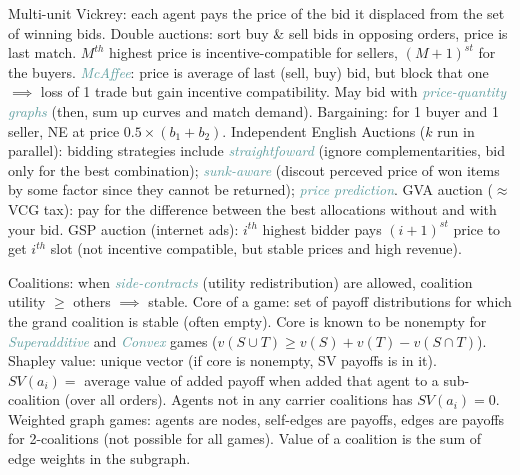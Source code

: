 \documentclass[10pt,a4paper,landscape]{article}
\newcommand{\concept}[1]{\textcolor{Emerald}{#1}} %
\newcommand{\subconcept}[1]{\textcolor{CadetBlue}{\textit{#1}}}
\renewcommand{\section}[1]{
    \vspace{-0.3cm}
    \begin{center}
      \color{Bittersweet}
      \hrulefill{\small~~#1~~}\hrulefill
    \end{center}
    \vspace{-0.3cm}
  }
\renewcommand{\subsection}[1]{\section{#1}}
\begin{document}
\begin{multicols*}{4}
\concept{Multi-unit Vickrey}: each agent pays the price of the bid it displaced from the set of winning bids.
\concept{Double auctions}: sort buy \& sell bids in opposing orders, price is last match. $M^{th}$ highest price is incentive-compatible for sellers, $(M+1)^{st}$ for the buyers. \subconcept{McAffee}: price is average of last (sell, buy) bid, but block that one $\implies$ loss of 1 trade but gain incentive compatibility. May bid with \subconcept{price-quantity graphs} (then, sum up curves and match demand).
\concept{Bargaining}: for 1 buyer and 1 seller, NE at price $0.5 \times (b_1 + b_2)$.
\concept{Independent English Auctions} ($k$ run in parallel): bidding strategies include \subconcept{straightfoward} (ignore complementarities, bid only for the best combination); \subconcept{sunk-aware} (discout perceved price of won items by some factor since they cannot be returned); \subconcept{price prediction}.
\concept{GVA auction} ($\approx$ VCG tax): pay for the difference between the best allocations without and with your bid.
\concept{GSP auction} (internet ads): $i^{th}$ highest bidder pays $(i+1)^{st}$ price to get $i^{th}$ slot (not incentive compatible, but stable prices and high revenue).

\subsection{Coalitions}

\concept{Coalitions}: when \subconcept{side-contracts} (utility redistribution) are allowed, coalition utility $\geq$ others $\implies$ stable.
\concept{Core} of a game: set of payoff distributions for which the grand coalition is stable (often empty).
Core is known to be nonempty for \subconcept{Superadditive} and \subconcept{Convex} games ($v(S \cup T) \geq v(S) + v(T) - v(S \cap T)$).
\concept{Shapley value}: unique vector (if core is nonempty, SV payoffs is in it). $SV(a_i) = $ average value of added payoff when added that agent to a sub-coalition (over all orders). Agents not in any carrier coalitions has $SV(a_i) = 0$.
\concept{Weighted graph games}: agents are nodes, self-edges are payoffs, edges are payoffs for 2-coalitions (not possible for all games). Value of a coalition is the sum of edge weights in the subgraph.

\subsection{Voting protocols}


\end{multicols*}
\end{document}
